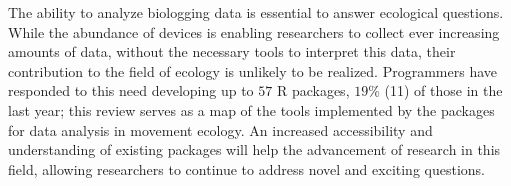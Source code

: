 \documentclass[a4paper,12pt]{article}
\newcommand{\Rpkg}[1]{\texttt{#1}}
\begin{document}
The ability to analyze biologging data is essential to answer ecological questions. While the abundance of devices is enabling researchers to collect ever increasing amounts of data, without the necessary tools to interpret this data, their contribution to the field of ecology is unlikely to be realized. Programmers have responded to this need developing up to $57$ R packages, $19\%$ (11) of those in the last year; this review serves as a map of the tools implemented by the packages for data analysis in movement ecology. An increased accessibility and understanding of existing packages will help the advancement of research in this field, allowing researchers to continue to address novel and exciting questions. 
%
%
\end{document}
